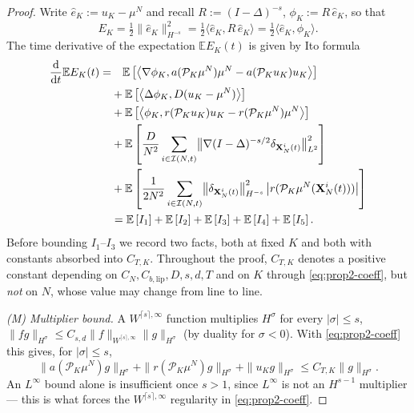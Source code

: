 \documentclass[a4paper,fleqn]{cas-sc}
\theoremstyle{definition}
\theoremstyle{remark}
\begin{document}
 \begin{proof}
Write $\widehat e_K:=u_K-\mu^N$ and recall $R:=(I-\Delta)^{-s}$,
$\phi_K:=R\,\widehat e_K$, so that
\[
E_K=\tfrac12\|\widehat e_K\|_{H^{-s}}^2
=\tfrac12\langle\widehat e_K,R\,\widehat e_K\rangle
=\tfrac12\langle\widehat e_K,\phi_K\rangle .
\]
The time derivative of the expectation $\mathbb{E}E_K(t)$ is given by Ito formula
\begin{equation}
 \begin{aligned}
 \frac{\mathrm{d}}{\mathrm{d} t} \mathbb E  E_K(t)  = &   \quad \mathbb E \left[\left\langle \nabla  \phi_K , a(\mathcal P_K \mu^N) \mu^N-  a(\mathcal P_K u_K) u_K   \right\rangle \right] \\
  & +  \mathbb E \left[\left\langle \Delta  \phi_K , D (u_K - \mu^N) \right\rangle \right] \\
  & + \mathbb E \left[\left\langle   \phi_K , r(\mathcal P_K u_K)u_K - r(\mathcal P_K \mu^N)\mu^N \right\rangle \right]  \\
  & +  \mathbb E \left[\frac{D}{N^2} \sum_{i\in \mathcal I (N,t)}  \bigl\|\nabla (I-\Delta)^{-s/2}\delta_{\mathbf{X}_N^i(t)}\bigr\|_{L^2}^2 \right] \\
  & + \mathbb E \left[\frac{1}{2N^2} \sum_{i\in \mathcal I (N,t)} \bigl\|\delta_{\mathbf{X}_N^i(t)}\bigr\|_{H^{-s}}^2 \left|r(\mathcal{P}_K \mu^N(\mathbf{X}_N^i(t)))\right|\right]\\
  & = \mathbb E \left[I_1\right]+\mathbb E \left[I_2\right]+\mathbb E \left[I_3\right]+\mathbb E \left[I_4\right]+
  \mathbb E \left[I_5\right].
 \end{aligned}
\end{equation}
Before bounding $I_1$--$I_3$ we record two facts, both at fixed $K$ and both
with constants absorbed into $C_{T,K}$. Throughout the proof, $C_{T,K}$ denotes a positive constant depending on $C_N,C_{b,\mathrm{lip}},D,s,d,T$ and on $K$ through \eqref{eq:prop2-coeff}, but \emph{not} on $N$, whose value may change from line to line.


\emph{(M) Multiplier bound.} A $W^{\lceil s\rceil,\infty}$ function multiplies
$H^\sigma$ for every $|\sigma|\le s$,
$\|fg\|_{H^\sigma}\le C_{s,d}\|f\|_{W^{\lceil s\rceil,\infty}}\|g\|_{H^\sigma}$
(by duality for $\sigma<0$). With \eqref{eq:prop2-coeff} this gives, for
$|\sigma|\le s$,
\[
\|a(\mathcal P_K\mu^N)g\|_{H^\sigma}
+\|r(\mathcal P_K\mu^N)g\|_{H^\sigma}
+\|u_K g\|_{H^\sigma}\le C_{T,K}\|g\|_{H^\sigma}.
\]
An $L^\infty$ bound alone is insufficient once $s>1$, since $L^\infty$ is not an
$H^{s-1}$ multiplier --- this is what forces the $W^{\lceil s\rceil,\infty}$
regularity in \eqref{eq:prop2-coeff}.


\end{proof}
\end{document}
